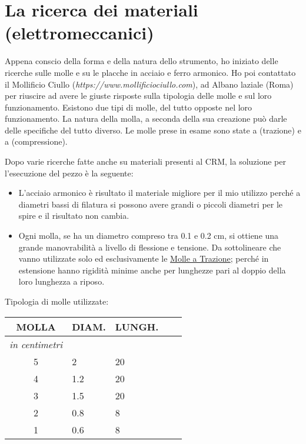 
\chapter{La ricerca dei materiali (elettromeccanici)}
\label{chp:La ricerca dei materiali (elettromeccanici)}

Appena conscio della forma e della natura dello strumento, ho iniziato delle ricerche sulle molle e su le placche in acciaio e ferro armonico. Ho poi contattato il Mollificio Ciullo (\textit{https://www.mollificiociullo.com}), ad Albano laziale (Roma) per riuscire ad avere le giuste risposte sulla tipologia delle molle e sul loro funzionamento. Esistono due tipi di molle, del tutto opposte nel loro funzionamento. La natura della molla, a seconda della sua creazione può darle delle specifiche del tutto diverso. Le molle prese in esame sono state a (trazione) e a (compressione).

Dopo varie ricerche fatte anche su materiali presenti al CRM, la soluzione per l'esecuzione del pezzo è la seguente:

\begin{itemize}
\item{L'acciaio armonico è risultato il materiale migliore per il mio utilizzo perché a diametri bassi di filatura si possono avere grandi o piccoli diametri per le spire e il risultato non cambia.}
\item{Ogni molla, se ha un diametro compreso tra 0.1 e 0.2 cm, si ottiene una grande manovrabilità a livello di flessione e tensione. Da sottolineare che vanno utilizzate solo ed esclusivamente le \underline {Molle a Trazione}; perché in estensione hanno rigidità minime anche per lunghezze pari al doppio della loro lunghezza a riposo.}
\end{itemize}

Tipologia di molle utilizzate:

\begin{tabular}{cp{2cm}p{2cm}p{.2cm}p{2cm}} \textbf{MOLLA}&\textbf{DIAM.}&\textbf{LUNGH.}\\
\hline \textit{in centimetri} \\
\hline 5&2&20\\
\hline 4&1.2&20\\
\hline 3&1.5&20\\
\hline 2&0.8&8\\
\hline 1&0.6&8\\
\end{tabular}

